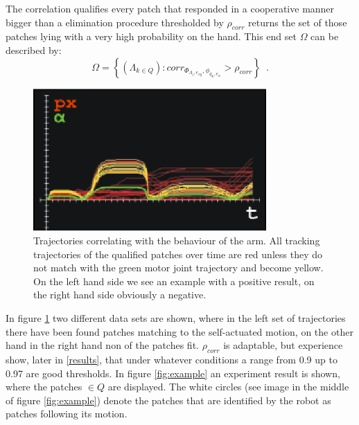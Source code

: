 \documentclass[conference]{IEEEtran}
\begin{document}
The correlation qualifies every patch that responded in a cooperative manner bigger than a elimination procedure thresholded by $\rho_{corr}$ returns the set of those patches lying with a very high probability on the hand. This end set $\Omega$ can be described by:
%
\begin{equation}
\label{endset}
 \Omega = \left\lbrace \left( \Lambda_{k \in Q} \right): corr_{\Phi_{\Lambda_{i}, e_{xy}}, \phi_{q_{k}, e_{\alpha}}} > \rho_{corr} \right\rbrace \enspace .
\end{equation}
%
\begin{figure}[h]
	\begin{center}
		\includegraphics[width=3.5in]{imgs/method/correlation.ps}
		\caption[Trajectories correlating with the behaviour of the arm. ]{Trajectories correlating with the behaviour of the arm. All tracking trajectories of the qualified patches over time are red unless they do not match with the green motor joint trajectory and become yellow. On the left hand side we see an example with a positive result, on the right hand side obviously a negative.}
		\label{fig:corr}
	\end{center}
\end{figure}
%
In figure \ref{fig:corr} two different data sets are shown, where in the left set of trajectories there have been found patches matching to the self-actuated motion, on the other hand in the right hand non of the patches fit. $\rho_{corr}$ is adaptable, but experience show, later in \ref{results}, that under whatever conditions a range from 0.9 up to 0.97 are good thresholds. In figure \ref{fig:example} an experiment result is shown, where the patches $\in Q$ are displayed. The white circles (see image in the middle of figure \ref{fig:example}) denote the patches that are identified by the robot as patches following its motion.
%
\end{document}
